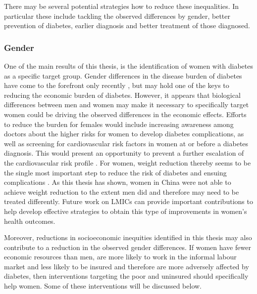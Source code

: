 There may be several potential strategies how to reduce these inequalities\DIFdelbegin {}\DIFdelend . In particular these include tackling the observed differences by gender, better prevention of diabetes, earlier diagnosis and better treatment of those diagnosed.

\subsubsection{Gender}

One of the main results of this thesis, is the identification of women with diabetes as a specific target group. Gender differences in the disease burden of diabetes have come to the forefront only recently \parencite{Peters2015}, but may hold one of the keys to reducing the economic burden of diabetes. However, it appears that biological differences between men and women may make it necessary to specifically target women \DIFdelbegin {}\DIFdelend \DIFaddbegin {}\DIFaddend \parencite{Peters2015,Peters2014a,Peters2014,Bertram2010} \DIFdelbegin {}\DIFdelend \DIFaddbegin {}\DIFaddend could be driving the observed differences in the economic effects. Efforts to reduce the burden for females would include increasing awareness among doctors about the higher risks for women to develop diabetes complications, as well as screening for cardiovascular risk factors in women at or before a diabetes diagnosis. This would present an opportunity to prevent a further escalation of the cardiovascular risk profile \parencite{Peters2015}. For women, weight reduction thereby seems to be the single most important step to reduce the risk of diabetes and ensuing complications \parencite{Peters2015}. As this thesis has shown, women in China were not able to achieve weight reduction to the extent men did and therefore may need to be treated differently. Future work on \acp{LMIC} can provide important contributions to help develop effective strategies to obtain this type of improvements in women's health outcomes.

Moreover, reductions in socioeconomic inequities identified in this thesis may also contribute to a reduction in the observed gender differences. If women have fewer economic resources than men, are more likely to work in the informal labour market and less likely to be insured \parencite{Galli2008} and therefore are more adversely affected by diabetes, then interventions targeting the poor and uninsured should specifically help women. Some of these interventions will be discussed below.

